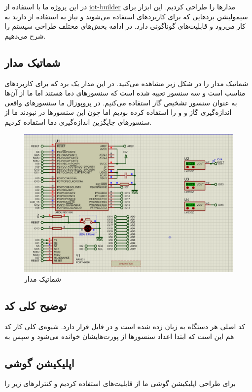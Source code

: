 در این پروژه ما با استفاده از 
\href{https://labcenter.s3.amazonaws.com/downloads/iotHelp.pdf}{iot-builder}
مدار‌ها را طراحی کردیم. این ابزار برای سیمولیشن برد‌هایی که برای کاربرد‌های 
استفاده می‌شوند و نیاز به استفاده از 
 دارند به کار می‌رود و قابلیت‌های گوناگونی دارد.  در ادامه بخش‌های مختلف طراحی سیستم را شرح می‌دهیم. 
\subsection{شماتیک مدار}
شماتیک مدار را در شکل زیر مشاهده می‌کنید. در این مدار یک برد 
که برای کاربرد‌های 
مناسب است و سه سنسور
تعبیه شده است که سنسور‌های دما هستند اما ما از آن‌ها به عنوان سنسور تشخیص گاز استفاده می‌کنیم. در پروپوزال ما سنسور‌های واقعی اندازه‌گیری گاز 
و 
و
را استفاده کرده بودیم اما چون این سنسور‌ها در 
نبودند ما از سنسور‌های جایگزین اندازه‌گیری دما استفاده کردیم.
\begin{figure}[h!]
	\centering		
	\includegraphics[width=\linewidth]{figs/circuit.png}
	\caption{شماتیک مدار}
\end{figure}

\subsection{توضیح کلی کد}
کد اصلی هر دستگاه به زبان 
زده شده است و در فایل 
قرار دارد. شیوه‌ی کلی کار کد هم این است که ابتدا اعداد سنسور‌ها از پورت‌هایشان خوانده می‌شود و سپس به 

\subsection{اپلیکیشن گوشی}
برای طراحی اپلیکیشن گوشی ما از قابلیت‌های 
استفاده کردیم و کنترلر‌های 
زیر را 

